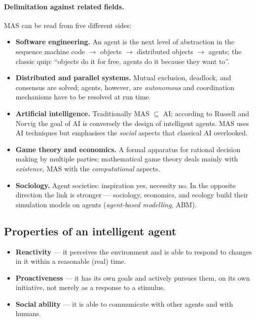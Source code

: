 \documentclass[11pt,a4paper]{article}
\theoremstyle{definition}
\providecommand{\uv}[1]{``#1''}
\begin{document}
\paragraph{Delimitation against related fields.} MAS can be read from five different sides:
\begin{itemize}
\item \textbf{Software engineering.} An agent is the next level of abstraction in the sequence
  machine code $\to$ objects $\to$ distributed objects $\to$ agents; the classic quip:
  \uv{objects do it for free, agents do it because they want to}.
\item \textbf{Distributed and parallel systems.} Mutual exclusion, deadlock, and consensus are
  solved; agents, however, are \emph{autonomous} and coordination mechanisms have to be resolved
  at run time.
\item \textbf{Artificial intelligence.} Traditionally MAS $\subseteq$ AI; according to Russell
  and Norvig the goal of AI is conversely the design of intelligent agents. MAS uses AI
  techniques but emphasises the \emph{social} aspects that classical AI overlooked.
\item \textbf{Game theory and economics.} A formal apparatus for rational decision making by
  multiple parties; mathematical game theory deals mainly with \emph{existence}, MAS with the
  \emph{computational} aspects.
\item \textbf{Sociology.} Agent societies: inspiration yes, necessity no. In the opposite
  direction the link is stronger --- sociology, economics, and ecology build their simulation
  models on agents (\emph{agent-based modelling}, ABM).
\end{itemize}
\subsection{Properties of an intelligent agent}

\begin{itemize}
\item \textbf{Reactivity} --- it perceives the environment and is able to respond to changes in
  it within a reasonable (real) time.
\item \textbf{Proactiveness} --- it has its own goals and actively pursues them, on its own
  initiative, not merely as a response to a stimulus.
\item \textbf{Social ability} --- it is able to communicate with other agents and with humans.
\end{itemize}
\end{document}
